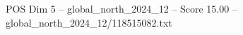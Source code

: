 \begin{textsample}{POS Dim 5 – global\_north\_2024\_12 – Score 15.00 – global\_north\_2024\_12/118515082.txt}
\end{textsample}
